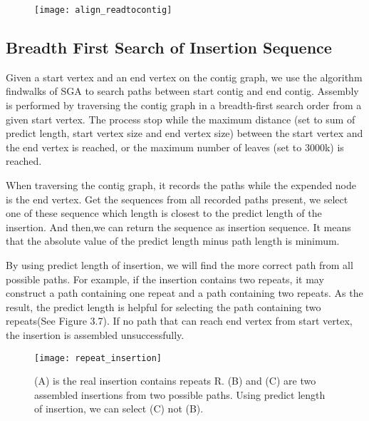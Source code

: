 \begin{figure}[ht]
\begin{center}
\texttt{[image: align\_readtocontig]}
\caption{}
\label{}
\end{center}
\end{figure}

\newpage

\subsection{Breadth First Search of Insertion Sequence}

Given a start vertex and an end vertex on the contig graph, we use the algorithm findwalks of SGA to search paths between start contig and end contig. Assembly is performed by traversing the contig graph in a breadth-first search order from a given start vertex. The process stop while the maximum distance (set to sum of predict length, start vertex size and end vertex size) between the start vertex and the end vertex is reached, or the maximum number of leaves (set to 3000k) is reached. 

When traversing the contig graph, it records the paths while the expended node is the end vertex. Get the sequences from all recorded paths present, we select one of these sequence which length is closest to the predict length of the insertion. And then,we can return the sequence as insertion sequence. It means that the absolute value of the predict length minus path length is minimum. 

By using predict length of insertion, we will find the more correct path from all possible paths. For example, if the insertion contains two repeats, it may construct a path containing one repeat and a path containing two repeats. As the result, the predict length is helpful for selecting the path containing two repeats(See Figure 3.7). If no path that can reach end vertex from start vertex, the insertion is assembled unsuccessfully. 




\begin{figure}[ht]
\begin{center}
\texttt{[image: repeat\_insertion]}
\caption{(A) is the real insertion contains repeats R. (B) and (C) are two assembled insertions from two possible paths. Using predict length of insertion, we can select (C) not (B).  }
\label{}
\end{center}
\end{figure}

